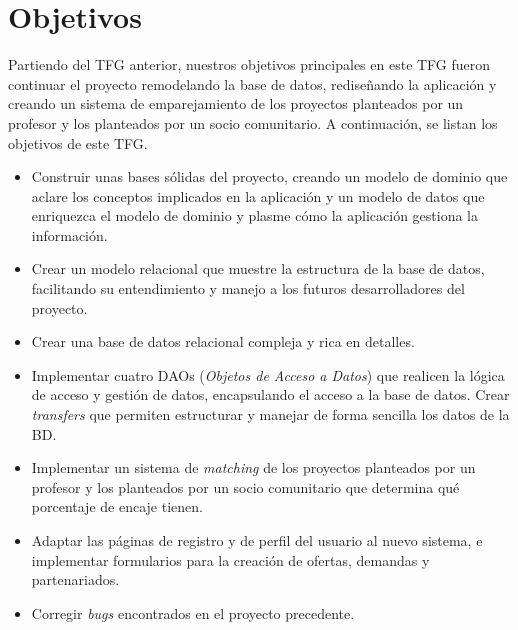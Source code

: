 \documentclass[11pt]{book}
\begin{document}
\section{Objetivos}
Partiendo del TFG anterior, nuestros objetivos principales en este TFG fueron continuar el proyecto remodelando la base de datos, rediseñando la aplicación y creando un sistema de emparejamiento de los proyectos planteados por un profesor y los planteados por un socio comunitario.
A continuación, se listan los objetivos de este TFG.
\begin{itemize} 
	\item Construir unas bases sólidas del proyecto, creando un modelo de dominio que aclare los conceptos implicados en la aplicación y un modelo de datos que enriquezca el modelo de dominio y plasme cómo la aplicación gestiona la información.
	\item Crear un modelo relacional que muestre la estructura de la base de datos, facilitando su entendimiento y manejo a los futuros desarrolladores del proyecto.
	\item Crear una base de datos relacional compleja y rica en detalles.
	\item Implementar cuatro DAOs (\emph{Objetos de Acceso a Datos}) que realicen la lógica de acceso y gestión de datos, encapsulando el acceso a la base de datos. Crear \textit{transfers} que permiten estructurar y manejar de forma sencilla los datos de la BD.
	\item Implementar un sistema de \textit{matching} de los proyectos planteados por un profesor y los planteados por un socio comunitario que determina qué porcentaje de encaje tienen.
	\item Adaptar las páginas de registro y de perfil del usuario al nuevo sistema, e implementar formularios para la creación de ofertas, demandas y partenariados.
	\item Corregir \textit{bugs} encontrados en el proyecto precedente.
\end{itemize}
\end{document}
